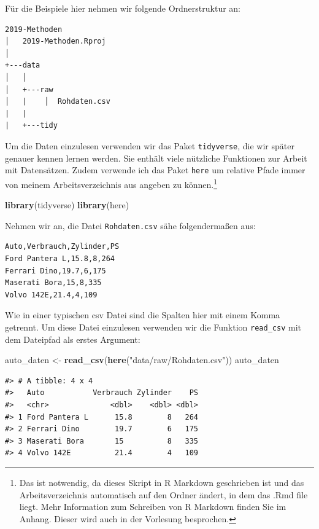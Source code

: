 \documentclass[]{tufte-book}
\newenvironment{Shaded}{}{}
\newcommand{\KeywordTok}[1]{\textcolor[rgb]{0.00,0.44,0.13}{\textbf{#1}}}
\newcommand{\StringTok}[1]{\textcolor[rgb]{0.25,0.44,0.63}{#1}}
\newcommand{\NormalTok}[1]{#1}
\begin{document}
Für die Beispiele hier nehmen wir folgende Ordnerstruktur an:

\begin{verbatim}
2019-Methoden
│   2019-Methoden.Rproj
│
+---data
│   │
│   +---raw
│   |    │  Rohdaten.csv
|   |
|   +---tidy
\end{verbatim}

Um die Daten einzulesen verwenden wir das Paket \texttt{tidyverse}, die
wir später genauer kennen lernen werden. Sie enthält viele nützliche
Funktionen zur Arbeit mit Datensätzen. Zudem verwende ich das Paket
\texttt{here} um relative Pfade immer von meinem Arbeitsverzeichnis aus
angeben zu können.\footnote{Das ist notwendig, da dieses Skript in R
  Markdown geschrieben ist und das Arbeitsverzeichnis automatisch auf
  den Ordner ändert, in dem das .Rmd file liegt. Mehr Information zum
  Schreiben von R Markdown finden Sie im Anhang. Dieser wird auch in der
  Vorlesung besprochen.}

\begin{Shaded}
\begin{Highlighting}[]
\KeywordTok{library}\NormalTok{(tidyverse)}
\KeywordTok{library}\NormalTok{(here)}
\end{Highlighting}
\end{Shaded}

Nehmen wir an, die Datei \texttt{Rohdaten.csv} sähe folgendermaßen aus:

\begin{verbatim}
Auto,Verbrauch,Zylinder,PS
Ford Pantera L,15.8,8,264
Ferrari Dino,19.7,6,175
Maserati Bora,15,8,335
Volvo 142E,21.4,4,109
\end{verbatim}

Wie in einer typischen csv Datei sind die Spalten hier mit einem Komma
getrennt. Um diese Datei einzulesen verwenden wir die Funktion
\texttt{read\_csv} mit dem Dateipfad als erstes Argument:

\begin{Shaded}
\begin{Highlighting}[]
\NormalTok{auto_daten <-}\StringTok{ }\KeywordTok{read_csv}\NormalTok{(}\KeywordTok{here}\NormalTok{(}\StringTok{"data/raw/Rohdaten.csv"}\NormalTok{))}
\NormalTok{auto_daten}
\end{Highlighting}
\end{Shaded}

\begin{verbatim}
#> # A tibble: 4 x 4
#>   Auto           Verbrauch Zylinder    PS
#>   <chr>              <dbl>    <dbl> <dbl>
#> 1 Ford Pantera L      15.8        8   264
#> 2 Ferrari Dino        19.7        6   175
#> 3 Maserati Bora       15          8   335
#> 4 Volvo 142E          21.4        4   109
\end{verbatim}
\end{document}
